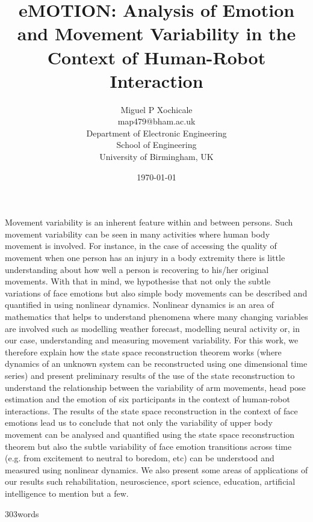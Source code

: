 \documentclass[12pt]{article}
\author{Miguel P Xochicale\\
map479@bham.ac.uk \\
Department of Electronic Engineering\\
School of Engineering\\
University of Birmingham, UK}
\title{
eMOTION: Analysis of Emotion and Movement Variability in the Context of Human-Robot Interaction
}
\date{\today}
\begin{document}
\maketitle

Movement variability is an inherent feature within and between persons.
Such movement variability can be seen in many activities where human 
body movement is involved. For instance,
 in the case of accessing the quality of movement 
when one person has an injury in a body extremity there is 
little understanding about how well a person is recovering 
to his/her original movements.
With that in mind, we hypothesise that not only the subtle 
variations of face emotions but also simple body movements can be 
described and quantified in using nonlinear dynamics.
Nonlinear dynamics is an area of mathematics that helps to 
understand phenomena where many changing variables are involved 
such as modelling weather forecast, modelling neural activity or, in our case,
 understanding and measuring movement variability.
For this work, we therefore explain how the state space reconstruction theorem 
works (where dynamics of an unknown system can be reconstructed using one dimensional 
time series) and
present preliminary results of the use of the state reconstruction
to understand the relationship between the variability of arm movements, head
pose estimation and the emotion of six participants in the context of 
human-robot interactions.
The results of the state space reconstruction in the context of face emotions 
lead us to conclude that not only the variability of upper body movement 
can be analysed and quantified using the state space reconstruction theorem
but also the subtle variability of face emotion transitions across time 
(e.g. from excitement to neutral to boredom, etc)
can be understood and measured using nonlinear dynamics.
We also present some areas of applications of our results such rehabilitation, 
neuroscience, sport science, education, artificial intelligence
to mention but a few.

303words
\end{document}
